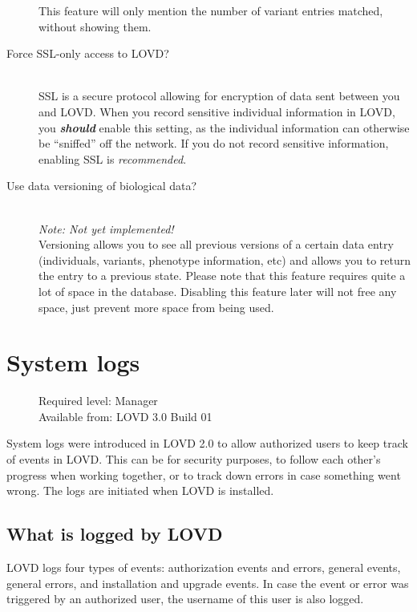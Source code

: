 \begin{description}
  This feature will only mention the number of variant entries matched, without showing them.
  \item[Force SSL-only access to LOVD?] \hfill \\
  SSL is a secure protocol allowing for encryption of data sent between you and LOVD.
  When you record sensitive individual information in LOVD, you \emph{\textbf{should}} enable this setting,
   as the individual information can otherwise be ``sniffed'' off the network.
  If you do not record sensitive information, enabling SSL is \emph{recommended}.
  \item[Use data versioning of biological data?] \hfill \\
  \emph{Note: Not yet implemented!}
  \\
  Versioning allows you to see all previous versions of a certain data entry (individuals, variants,
   phenotype information, etc) and allows you to return the entry to a previous state.
  Please note that this feature requires quite a lot of space in the database.
  Disabling this feature later will not free any space, just prevent more space from being used.
\end{description}





\section{System logs}
\begin{wrapfigure}[3]{r}{8cm} %
  \vspace{-25pt}
  \begin{leftbar}
    Required level: Manager\\
    Available from: LOVD 3.0 Build 01
  \end{leftbar}
\end{wrapfigure}
System logs were introduced in LOVD 2.0 to allow authorized users to keep track of events in LOVD.
This can be for security purposes, to follow each other's progress when working together,
or to track down errors in case something went wrong.
The logs are initiated when LOVD is installed.



\subsection{What is logged by LOVD}
LOVD logs four types of events: authorization events and errors, general events, general errors, and installation and upgrade events.
In case the event or error was triggered by an authorized user, the username of this user is also logged.

